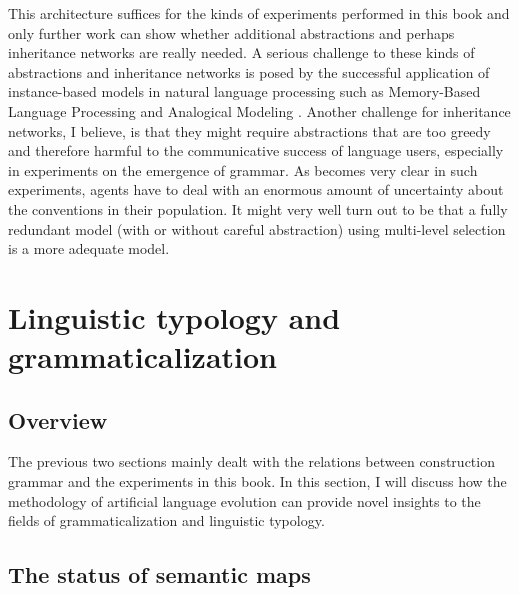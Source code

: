 This architecture suffices for the kinds of experiments performed in this book and only further work can show whether additional abstractions and perhaps inheritance networks are really needed. A serious challenge to these kinds of abstractions and inheritance networks is posed by the successful application of instance-based models in natural language processing such as Memory-Based Language Processing \citep{daelemans05memory} and Analogical Modeling \citep{skousen89analogical}. Another challenge for inheritance networks, I believe, is that they might require abstractions that are too greedy and therefore harmful to the communicative success of language users, especially in experiments on the emergence of grammar. As becomes very clear in such experiments, agents have to deal with an enormous amount of uncertainty about the conventions in their population. It might very well turn out to be that a fully redundant model (with or without careful abstraction) using multi-level selection is a more adequate model.

\section{Linguistic typology and grammaticalization}
\label{s:comp-semmaps}

\subsection{Overview}
The previous two sections mainly dealt with the relations between construction grammar and the experiments in this book. In this section, I will discuss how the methodology of artificial language evolution can provide novel insights to the fields of grammaticalization and linguistic typology.

\subsection{The status of semantic maps}
\label{s:semantic-maps}

